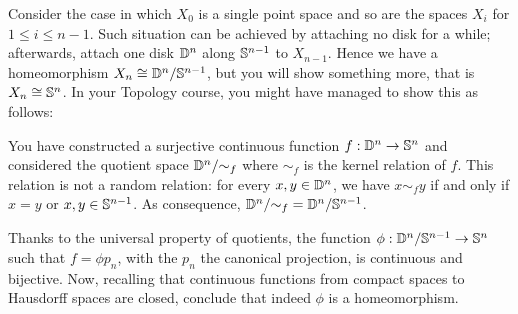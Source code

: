 \begin{exercise} Consider the case in which \(X_0\) is a single point space and so are the spaces \(X_i\) for \(1 \le i \le n-1\). Such situation can be achieved by attaching no disk for a while; afterwards, attach one disk \(\mathbb D^{n}\) along \(\mathbb S^{n-1}\) to \(X_{n-1}\). Hence we have a homeomorphism \(X_n \cong {\mathbb D^n}{/}{\mathbb S^{n-1}}\), but you will show something more, that is \(X_n \cong \mathbb S^n\).\newline
In your Topology course, you might have managed to show this as follows:
\begin{tcbenum}
\item You have constructed a surjective continuous function \(f : \mathbb D^n \to \mathbb S^n\) and considered the quotient space \({\mathbb D^n}{/}{\sim_f}\) where \(\sim_f\) is the kernel relation  of \(f\). This relation is not a random relation: for every \(x, y \in \mathbb D^n\), we have \(x \sim_f y\) if and only if \(x = y\) or \(x, y \in \mathbb S^{n-1}\). As consequence, \({\mathbb D^n}{/}{\sim_f} = {\mathbb D^n}{/}{\mathbb S^{n-1}}\).
\item Thanks to the universal property of quotients, the function \(\phi : {\mathbb D^n}{/}{\mathbb S^{n-1}} \to \mathbb S^n\) such that \(f = \phi p_n\), with the \(p_n\) the canonical projection, is continuous and bijective. Now, recalling that continuous functions from compact spaces to Hausdorff spaces are closed, conclude that indeed \(\phi\) is a homeomorphism.
\end{tcbenum}

\end{exercise}
